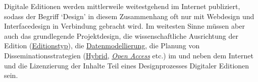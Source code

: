 \documentclass{article}
\begin{document}
    Digitale Editionen werden mittlerweile weitestgehend im Internet publiziert,
                  sodass der Begriff ‘Design’ in diesem Zusammenhang oft nur mit Webdesign und
                  Interfacedesign in Verbindung gebracht wird. Im weitesten Sinne müssen aber auch
                  das grundlegende Projektdesign, die wissenschaftliche Ausrichtung der Edition
                     (\href{http://gams.uni-graz.at/o:konde.76}{Editionstyp}), die \href{http://gams.uni-graz.at/o:konde.137}{Datenmodellierung}, die Planung von
                  Disseminationsstrategien (\href{http://gams.uni-graz.at/o:konde.138}{Hybrid},
                     \emph{\href{http://gams.uni-graz.at/o:konde.152}{Open
                     Access}} etc.) im und neben dem Internet und die Lizenzierung der
                  Inhalte Teil eines Designprozesses Digitaler Editionen sein. \\
            
\end{document}
